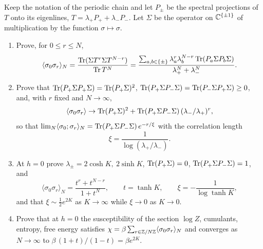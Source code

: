 \begin{exercise}
Keep the notation of the periodic chain and let $P_\pm$ be the spectral
projections of $T$ onto its eigenlines, $T=\lambda_+P_++\lambda_-P_-$.  Let
$\Sigma$ be the operator on $\mathbb C^{\{\pm1\}}$ of multiplication by the
function $\sigma\mapsto\sigma$.
\begin{enumerate}[label=(\alph*)]
\item Prove, for $0\le r\le N$,
\[
 \langle\sigma_0\sigma_r\rangle_N=\frac{\operatorname{Tr}(\Sigma T^r\Sigma T^{N-r})}{\operatorname{Tr} T^N}
 =\frac{\sum_{a,b\in\{\pm\}}\lambda_a^r\lambda_b^{N-r}\operatorname{Tr}(P_a\Sigma P_b\Sigma)}
 {\lambda_+^N+\lambda_-^N}.
\]
\item Prove that $\operatorname{Tr}(P_+\Sigma P_+\Sigma)=\operatorname{Tr}(P_+\Sigma)^2$,
$\operatorname{Tr}(P_+\Sigma P_-\Sigma)=\operatorname{Tr}(P_-\Sigma P_+\Sigma)\ge0$, and, with $r$
fixed and $N\to\infty$,
\[
 \langle\sigma_0\sigma_r\rangle\to\operatorname{Tr}(P_+\Sigma)^2
 +\operatorname{Tr}(P_+\Sigma P_-\Sigma)\,(\lambda_-/\lambda_+)^r,
\]
so that $\lim_N\langle\sigma_0;\sigma_r\rangle_N=\operatorname{Tr}(P_+\Sigma P_-\Sigma)\,e^{-r/\xi}$ with the
correlation length
\[
 \xi=\frac1{\log(\lambda_+/\lambda_-)} .
\]
\item At $h=0$ prove $\lambda_\pm=2\cosh K,\ 2\sinh K$, $\operatorname{Tr}(P_+\Sigma)=0$,
$\operatorname{Tr}(P_+\Sigma P_-\Sigma)=1$, and
\[
 \langle\sigma_0\sigma_r\rangle_N=\frac{t^r+t^{N-r}}{1+t^N},\qquad t=\tanh K,
 \qquad \xi=-\frac1{\log\tanh K},
\]
and that $\xi\sim\tfrac12e^{2K}$ as $K\to\infty$ while $\xi\to0$ as $K\to0$.
\item Prove that at $h=0$ the susceptibility of the section
$\log Z$, cumulants, entropy, free energy satisfies
$\chi=\beta\sum_{r\in\mathbb Z/N\mathbb Z}\langle\sigma_0\sigma_r\rangle_N$ and converges as
$N\to\infty$ to $\beta\,(1+t)/(1-t)=\beta e^{2K}$.
\end{enumerate}
\end{exercise}

